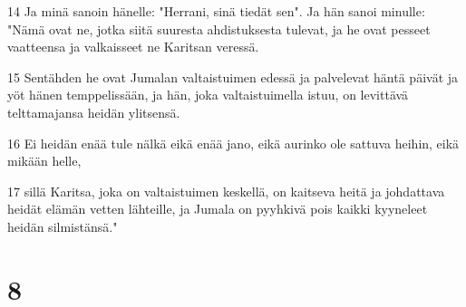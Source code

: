 \par 14 Ja minä sanoin hänelle: "Herrani, sinä tiedät sen". Ja hän sanoi minulle: "Nämä ovat ne, jotka siitä suuresta ahdistuksesta tulevat, ja he ovat pesseet vaatteensa ja valkaisseet ne Karitsan veressä.
\par 15 Sentähden he ovat Jumalan valtaistuimen edessä ja palvelevat häntä päivät ja yöt hänen temppelissään, ja hän, joka valtaistuimella istuu, on levittävä telttamajansa heidän ylitsensä.
\par 16 Ei heidän enää tule nälkä eikä enää jano, eikä aurinko ole sattuva heihin, eikä mikään helle,
\par 17 sillä Karitsa, joka on valtaistuimen keskellä, on kaitseva heitä ja johdattava heidät elämän vetten lähteille, ja Jumala on pyyhkivä pois kaikki kyyneleet heidän silmistänsä."

\chapter{8}

